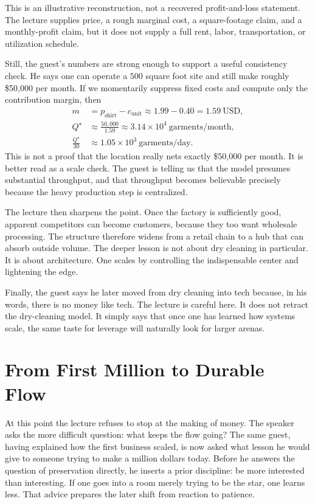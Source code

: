 \begin{remark}
This is an illustrative reconstruction, not a recovered profit-and-loss statement. The lecture supplies price, a rough marginal cost, a square-footage claim, and a monthly-profit claim, but it does not supply a full rent, labor, transportation, or utilization schedule.
\end{remark}

Still, the guest's numbers are strong enough to support a useful consistency check. He says one can operate a $500$ square foot site and still make roughly \$50{,}000 per month. If we momentarily suppress fixed costs and compute only the contribution margin, then
\begin{align}
m &= p_{\text{shirt}} - c_{\text{unit}} \approx 1.99 - 0.40 = 1.59\ \text{USD}, \\
Q^\star &\approx \frac{50{,}000}{1.59} \approx 3.14\times 10^4\ \text{garments/month}, \\
\frac{Q^\star}{30} &\approx 1.05\times 10^3\ \text{garments/day}.
\end{align}
This is not a proof that the location really nets exactly \$50{,}000 per month. It is better read as a scale check. The guest is telling us that the model presumes substantial throughput, and that throughput becomes believable precisely because the heavy production step is centralized.

The lecture then sharpens the point. Once the factory is sufficiently good, apparent competitors can become customers, because they too want wholesale processing. The structure therefore widens from a retail chain to a hub that can absorb outside volume. The deeper lesson is not about dry cleaning in particular. It is about architecture. One scales by controlling the indispensable center and lightening the edge.

Finally, the guest says he later moved from dry cleaning into tech because, in his words, there is no money like tech. The lecture is careful here. It does not retract the dry-cleaning model. It simply says that once one has learned how systems scale, the same taste for leverage will naturally look for larger arenas.

\section{From First Million to Durable Flow}

At this point the lecture refuses to stop at the making of money. The speaker asks the more difficult question: what keeps the flow going? The same guest, having explained how the first business scaled, is now asked what lesson he would give to someone trying to make a million dollars today. Before he answers the question of preservation directly, he inserts a prior discipline: be more interested than interesting. If one goes into a room merely trying to be the star, one learns less. That advice prepares the later shift from reaction to patience.

